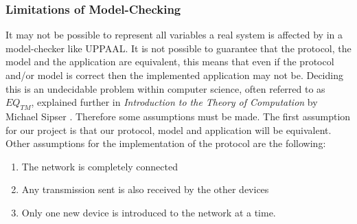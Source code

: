 \subsubsection{Limitations of Model-Checking}

It may not be possible to represent all variables a real system is affected by in a model-checker like UPPAAL.
It is not possible to guarantee that the protocol, the model and the application are equivalent, this means that even if the protocol and/or model is correct then the implemented application may not be. 
Deciding this is an undecidable problem within computer science, often referred to as $EQ_{TM}$, explained further in \textit{Introduction to the Theory of Computation} by Michael Sipser \citep[p. 220]{Sipser}.
Therefore some assumptions must be made. 
The first assumption for our project is that our protocol, model and application will be equivalent.
Other assumptions for the implementation of the protocol are the following: 
\begin{enumerate}[label=\itshape \alph*\upshape)]
    \item The network is completely connected
    \item Any transmission sent is also received by the other devices
    \item Only one new device is introduced to the network at a time.
\end{enumerate}
